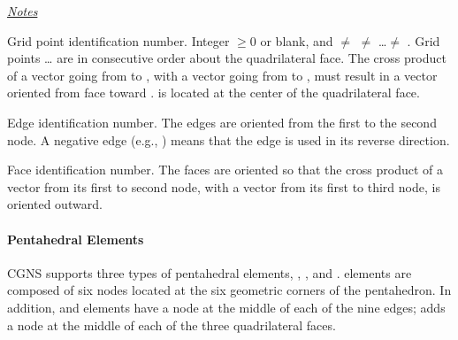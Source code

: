 {{{\bigskip

\uline{\textit{Notes}}%
\begin{Ventryi}{}
   \item [\fort{N1,\ldots,N14}]
         Grid point identification number.
         Integer $\ge 0$ or blank, and  $\ne$ 
         $\ne$ \ldots $\ne$ .
         Grid points \ldots{} are in consecutive order about
         the quadrilateral face.
         The cross product of a vector going from  to ,
         with a vector going from  to , must result in a
         vector oriented from face  toward .
          is located at the center of the quadrilateral face.
   \item [\fort{E1,\ldots,E8}]
         Edge identification number.
         The edges are oriented from the first to the second node.
         A negative edge (e.g., ) means that the edge is used in
         its reverse direction.
   \item [\fort{F1,\ldots,F5}]
         Face identification number.
         The faces are oriented so that the cross product of a vector
         from its first to second node, with a vector from its first to
         third node, is oriented outward.
\end{Ventryi}

\paragraph{Pentahedral Elements}
CGNS supports three types of pentahedral elements, ,
, and .
 elements are composed of six nodes located at the
six geometric corners of the pentahedron.
In addition,  and  elements have a node
at the middle of each of the nine edges;  adds a
node at the middle of each of the three quadrilateral faces.

}}}
